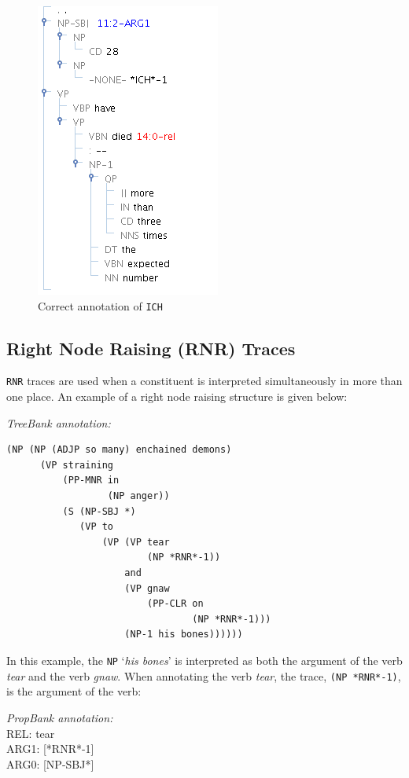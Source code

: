 \documentclass[11pt]{report}
\begin{document}
\begin{figure}[htbp]
\centering
\includegraphics[scale=0.6]{img/ICH.png}
\caption{Correct annotation of \texttt{ICH}}
\label{fig: ICH}
\end{figure}

\subsection{Right Node Raising (RNR) Traces}

\texttt{RNR} traces are used when a constituent is interpreted simultaneously in more than one place. An example of a right node raising structure is given below:

\textit{TreeBank annotation:}
 \begin{verbatim}
(NP (NP (ADJP so many) enchained demons)
      (VP straining
          (PP-MNR in
                  (NP anger))
          (S (NP-SBJ *)
             (VP to
                 (VP (VP tear
                         (NP *RNR*-1))
                     and
                     (VP gnaw
                         (PP-CLR on
                                 (NP *RNR*-1)))
                     (NP-1 his bones))))))
 \end{verbatim}

In this example, the \texttt{NP} `\textit{his bones}' is interpreted as both the argument of the verb \textit{tear} and the verb \textit{gnaw}. When annotating the verb \textit{tear}, the trace, \texttt{(NP *RNR*-1)}, is the argument of the verb:

\textit{PropBank annotation:}\\
REL: tear\\
ARG1: [*RNR*-1]\\ 
ARG0: [NP-SBJ*] 
\end{document}
